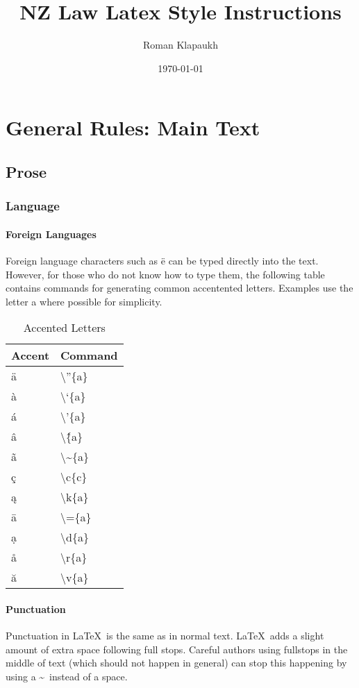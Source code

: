 \documentclass{nzlaw}
\newcommand{\s}{\textbackslash}
\newcommand{\latex}{\LaTeX}
\begin{document}
\title{NZ Law Latex Style Instructions}
\author{Roman Klapaukh}
\date{\today}

\maketitle

\section{General Rules: Main Text}
\subsection{Prose}
\subsubsection{Language}

\paragraph{Foreign Languages}
Foreign language characters such as \"{e} can be typed directly into the  text. However, for those who do not know how to type them, the following table contains commands for generating common accentented letters. Examples use the letter a where possible for simplicity.

\begin{table}[H]
\centering
\begin{tabular}{|l|l|}
\hline
Accent & Command \\ \hline
\"{a} & \s''\{a\} \\
\`{a} & \s`\{a\} \\
\'{a} & \s'\{a\} \\
\^{a} & \s\^\{a\}\\
\~{a} & \s\textasciitilde\{a\}\\
\c{c} & {\s}c\{c\}\\
\k{a} & {\s}k\{a\}\\
\={a} & \s=\{a\}\\
\d{a} & {\s}d\{a\}\\
\r{a} & {\s}r\{a\}\\
\u{a} & {\s}v\{a\}\\
\hline
\end{tabular}
\caption{Accented Letters}
\end{table}

\paragraph{Punctuation}
Punctuation in \latex~is the same as in normal text. \latex~adds a slight amount of extra space following full stops. Careful authors using fullstops in the middle of text (which should not happen in general) can stop this happening by using a \textasciitilde~instead of a space.
\end{document}
